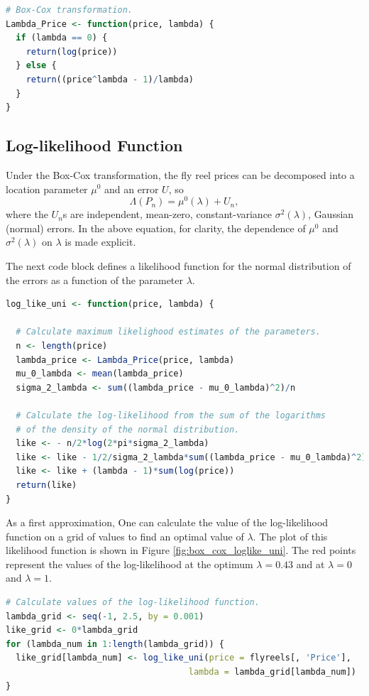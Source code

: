 \documentclass[11pt]{book}
\begin{document}
\vspace{1.0in}

\begin{lstlisting}[language=R]
# Box-Cox transformation.
Lambda_Price <- function(price, lambda) {
  if (lambda == 0) {
    return(log(price))
  } else {
    return((price^lambda - 1)/lambda)
  }
}
\end{lstlisting}

\pagebreak
\subsection{Log-likelihood Function}

Under the Box-Cox transformation,
the fly reel prices can be decomposed into a location parameter $\mu^0$ 
and an error $U$, so
$$\Lambda(P_n) = \mu^0(\lambda) + U_n,$$
where the $U_n$s are independent, mean-zero, constant-variance 
$\sigma^2(\lambda)$, Gaussian (normal) errors. 
In the above equation, for clarity, the dependence of $\mu^0$ and 
$\sigma^2(\lambda)$ on $\lambda$ is made explicit.


The next code block defines a likelihood function for the normal distribution of the errors
as a function of the parameter $\lambda$.

\begin{lstlisting}[language=R]
log_like_uni <- function(price, lambda) {

  # Calculate maximum likelighood estimates of the parameters.
  n <- length(price)
  lambda_price <- Lambda_Price(price, lambda)
  mu_0_lambda <- mean(lambda_price)
  sigma_2_lambda <- sum((lambda_price - mu_0_lambda)^2)/n

  # Calculate the log-likelihood from the sum of the logarithms
  # of the density of the normal distribution.
  like <- - n/2*log(2*pi*sigma_2_lambda)
  like <- like - 1/2/sigma_2_lambda*sum((lambda_price - mu_0_lambda)^2)
  like <- like + (lambda - 1)*sum(log(price))
  return(like)
}
\end{lstlisting}

\pagebreak
As a first approximation, 
One can calculate the value of the log-likelihood function on a grid of values
to find an optimal value of $\lambda$.
The plot of this likelihood function is shown in Figure \ref{fig:box_cox_loglike_uni}.
The red points represent the values of the log-likelihood 
at the optimum $\lambda = 0.43$ and at $\lambda = 0$ and $\lambda = 1$.

\begin{lstlisting}[language=R]
# Calculate values of the log-likelihood function.
lambda_grid <- seq(-1, 2.5, by = 0.001)
like_grid <- 0*lambda_grid
for (lambda_num in 1:length(lambda_grid)) {
  like_grid[lambda_num] <- log_like_uni(price = flyreels[, 'Price'],
                                    lambda = lambda_grid[lambda_num])
}
\end{lstlisting}
\end{document}

